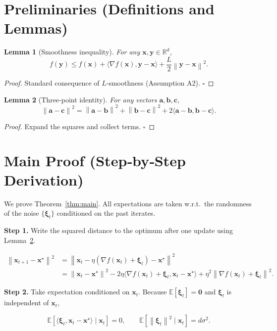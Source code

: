 \documentclass{article}
\newtheorem{lemma}{Lemma}
\newcommand{\E}{\mathbb{E}}
\newcommand{\R}{\mathbb{R}}
\newcommand{\norm}[1]{\left\|#1\right\|}
\newcommand{\inner}[2]{\langle #1,#2\rangle}
\newcommand{\grad}{\nabla}
\begin{document}
\newpage
\section*{Preliminaries (Definitions and Lemmas)}
\begin{lemma}[Smoothness inequality]\label{lem:smooth}
For any $\bm{x},\bm{y}\in\R^{d}$,
\[
f(\bm{y})\le f(\bm{x})+\inner{\grad f(\bm{x})}{\bm{y}-\bm{x}}+\frac{L}{2}\norm{\bm{y}-\bm{x}}^{2}.
\]
\end{lemma}
\begin{proof}
Standard consequence of $L$‑smoothness (Assumption A2). \hfill $\square$
\end{proof}

\begin{lemma}[Three‑point identity]\label{lem:three}
For any vectors $\bm{a},\bm{b},\bm{c}$,
\[
\norm{\bm{a}-\bm{c}}^{2}= \norm{\bm{a}-\bm{b}}^{2}+ \norm{\bm{b}-\bm{c}}^{2}+2\inner{\bm{a}-\bm{b}}{\bm{b}-\bm{c}} .
\]
\end{lemma}
\begin{proof}
Expand the squares and collect terms. \hfill $\square$
\end{proof}

\section*{Main Proof (Step‑by‑Step Derivation)}
We prove Theorem~\ref{thm:main}. All expectations are taken w.r.t.\ the randomness of the noise $\{\bm{\xi}_t\}$ conditioned on the past iterates.

\noindent\textbf{Step 1.}  Write the squared distance to the optimum after one update using Lemma~\ref{lem:three}.

\[
\begin{aligned}
\norm{\bm{x}_{t+1}-\bm{x}^{\star}}^{2}
&= \norm{\bm{x}_{t}-\eta(\grad f(\bm{x}_t)+\bm{\xi}_t)-\bm{x}^{\star}}^{2}\\
&= \norm{\bm{x}_{t}-\bm{x}^{\star}}^{2}
  -2\eta\inner{\grad f(\bm{x}_t)+\bm{\xi}_t}{\bm{x}_{t}-\bm{x}^{\star}}
  +\eta^{2}\norm{\grad f(\bm{x}_t)+\bm{\xi}_t}^{2}.
\tag{4}
\end{aligned}
\]

\noindent\textbf{Step 2.}  Take expectation conditioned on $\bm{x}_t$.
Because $\E[\bm{\xi}_t]=\mathbf0$ and $\bm{\xi}_t$ is independent of $\bm{x}_t$,

\[
\E\!\left[\inner{\bm{\xi}_t}{\bm{x}_{t}-\bm{x}^{\star}}\mid\bm{x}_t\right]=0,
\qquad 
\E\!\left[\norm{\bm{\xi}_t}^{2}\mid\bm{x}_t\right]=d\sigma^{2}.
\tag{5}
\]
\end{document}

